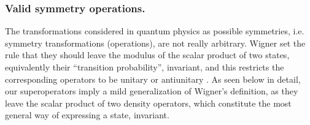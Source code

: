 {\subsubsection{Valid symmetry operations.\label{sst}}
%


The transformations considered in quantum physics as possible symmetries, i.e. symmetry transformations (operations), are not really arbitrary. Wigner set the rule that they should leave the modulus of the  scalar product of two states, equivalently their ``transition probability'', invariant,  and this restricts the corresponding operators to be unitary or antiunitary \cite{Wigner1959}. As seen below in detail, our  superoperators imply a mild generalization of Wigner's definition, as they  leave the scalar product of two
density operators, which constitute the most general way of expressing a state, invariant.

}
